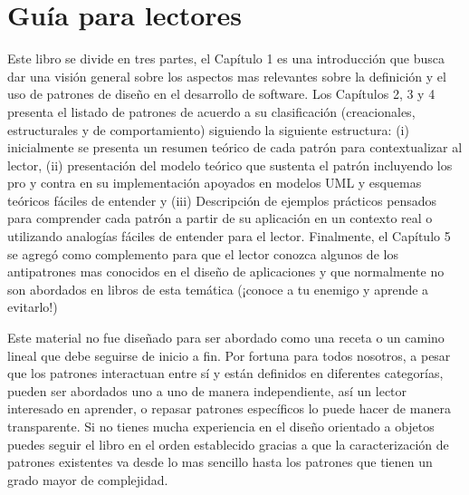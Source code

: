 \chapter*{Guía para lectores}

Este libro se divide en tres partes, el Capítulo 1 es una introducción que busca dar una visión general sobre los aspectos mas relevantes sobre la definición y el uso de patrones de diseño en el desarrollo de software. Los Capítulos 2, 3 y 4 presenta el listado de patrones de acuerdo a su clasificación (creacionales, estructurales y de comportamiento) siguiendo la siguiente estructura: (i) inicialmente se presenta un resumen teórico de cada patrón para contextualizar al lector, (ii) presentación del modelo teórico que sustenta el patrón incluyendo los pro y contra en su implementación apoyados en modelos UML y esquemas teóricos fáciles de entender y (iii) Descripción de ejemplos prácticos pensados para comprender cada patrón a partir de su aplicación en un contexto real o utilizando analogías fáciles de entender para el lector. Finalmente, el Capítulo 5 se agregó como complemento para que el lector conozca algunos de los antipatrones mas conocidos en el diseño de aplicaciones y que normalmente no son abordados en libros de esta temática (¡conoce a tu enemigo y aprende a evitarlo!)

Este material no fue diseñado para ser abordado como una receta o un camino lineal que debe seguirse de inicio a fin. Por fortuna para todos nosotros, a pesar que los patrones interactuan entre sí y están definidos en diferentes categorías, pueden ser abordados uno a uno de manera independiente, así un lector interesado en aprender, o repasar patrones específicos lo puede hacer de manera transparente. Si no tienes mucha experiencia en el diseño orientado a objetos puedes seguir el libro en el orden establecido gracias a que la caracterización de patrones existentes va desde lo mas sencillo hasta los patrones que tienen un grado mayor de complejidad.